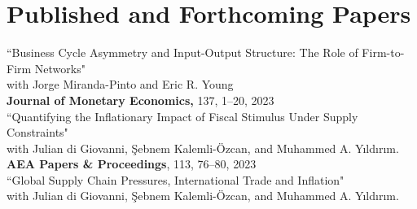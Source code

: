 \documentclass[10pt]{article}
\begin{document}
\section*{Published and Forthcoming Papers}
\iffalse
\begin{enumerate}[wide, labelwidth=!,labelindent=5pt]
    \item Business Cycle Asymmetry and Input-Output Structure: The Role of Firm-to-Firm Networks (2023), with Jorge Miranda-Pinto and Eric R. Young, accepted, \emph{\bfseries Journal of Monetary Economics}.
    \item Quantifying the Inflationary Impact of Fiscal Stimulus Under Supply Constraints (2023), with Julian di Giovanni, \c{S}ebnem Kalemli-\"{O}zcan, and Muhammed A. Y{\i}ld{\i}r{\i}m, Forthcoming, \emph{\bfseries American Economic Association, Papers \& Proceedings}.
    \item Global Supply Chain Pressures, International Trade and Inflation (2022), with Julian di Giovanni, \c{S}ebnem Kalemli-\"{O}zcan, and Muhammed A. Y{\i}ld{\i}r{\i}m,  \textit{\bfseries Conference Proceedings ECB Forum: ``Challenges for Monetary Policy in a Rapidly Changing World''}
    \item Price Controls, Hyperinflation, and the Inflation-Relative Price Variability Relationship (2021), with Rodrigo Cerda and Rolf L\"{u}ders,  \textbf{\textit{Empirical Economics}}, \emph{61}(4), pp. 1725--1748.
\end{enumerate}
\fi

 ``Business Cycle Asymmetry and Input-Output Structure: The Role of Firm-to-Firm Networks"\\
 \indent with Jorge Miranda-Pinto and Eric R. Young\\
\indent \textbf{Journal of Monetary Economics,} 137, 1--20, 2023\\[-0.125in]

\noindent ``Quantifying the Inflationary Impact of Fiscal Stimulus Under Supply Constraints"\\
\indent with Julian di Giovanni, \c{S}ebnem Kalemli-\"{O}zcan, and Muhammed A. Y{\i}ld{\i}r{\i}m. \\
\indent \textbf{AEA Papers \& Proceedings}, 113, 76--80, 2023\\[-0.125in]

\noindent ``Global Supply Chain Pressures, International Trade and Inflation"\\
\indent with Julian di Giovanni, \c{S}ebnem Kalemli-\"{O}zcan, and Muhammed A. Y{\i}ld{\i}r{\i}m. \\
\\[-0.125in]
\end{document}
